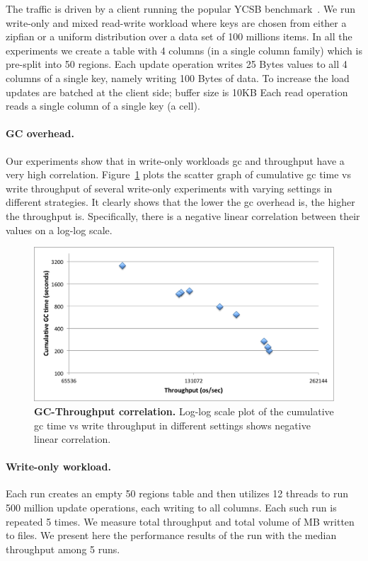 The traffic is driven by a client running the popular YCSB benchmark~\cite{Cooper}. 
We run write-only and mixed read-write workload where keys are chosen from either a zipfian or a uniform distribution over a data set of 100 millions items.
In all the experiments we create a table with 4 columns (in a single column family) which is pre-split into 50 regions. 
Each update operation writes 25 Bytes values to all 4 columns of a single key, namely writing 100 Bytes of data. To increase the load updates are batched at the client side; buffer size is 10KB
Each read operation reads a single column of a single key (a cell).


\paragraph{GC overhead.}

Our experiments show that in write-only workloads gc and throughput have a very high correlation. 
Figure~\ref{fig:gc-throughput-log2} plots the scatter graph of cumulative gc time vs write throughput of several write-only experiments with varying settings in different strategies. It clearly shows that  the lower the gc overhead is, the higher the throughput is.
Specifically, there is a negative linear correlation between their values on a log-log scale.

\begin{figure}[htb]
\includegraphics[width=\figw]{Figs/gc-throughput-log2.png}
\caption{{\bf GC-Throughput correlation.} Log-log scale plot of the cumulative gc time vs write throughput in different settings shows negative linear correlation.
}
\label{fig:gc-throughput-log2}
\end{figure}


\paragraph{Write-only workload.}
Each run creates an empty 50 regions table and then utilizes 12 threads to run 500 million update operations, each writing to all columns. Each such run is repeated 5 times. 
We measure total  throughput and total volume of MB written to files. We present here the performance results of the run with the median throughput among 5 runs.

